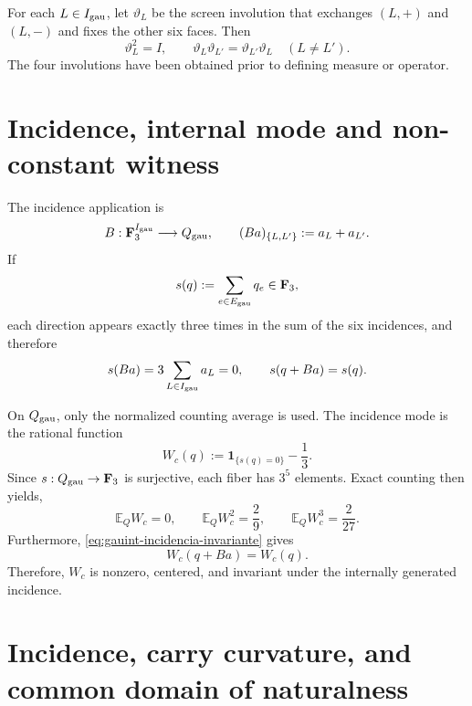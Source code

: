 For each \(L\in I_{\rm gau}\), let \(\vartheta_L\) be the screen
involution that exchanges \((L,+)\) and \((L,-)\) and fixes the other six
faces. Then
\begin{equation}\label{eq:gauint-cuatro-involuciones}
 \vartheta_L^2=I,
 \qquad
 \vartheta_L\vartheta_{L'}=\vartheta_{L'}\vartheta_L
 \quad(L\ne L').
\end{equation}
The four involutions have been obtained prior to defining measure or operator.

\section{Incidence, internal mode and non-constant witness}

The incidence application is
\begin{equation}\label{eq:gauint-incidencia-b}
 B:\mathbf F_3^{I_{\rm gau}}\longrightarrow Q_{\rm gau},
 \qquad
 (Ba)_{\{L,L'\}}:=a_L+a_{L'}.
\end{equation}
If
\[
 s(q):=\sum_{e\in E_{\rm gau}}q_e\in\mathbf F_3,
\]
each direction appears exactly three times in the sum of the six
incidences, and therefore
\begin{equation}\label{eq:gauint-incidencia-invariante}
 s(Ba)=3\sum_{L\in I_{\rm gau}}a_L=0,
 \qquad
 s(q+Ba)=s(q).
\end{equation}

On \(Q_{\rm gau}\), only the normalized counting average is used.
The incidence mode is the rational function
\begin{equation}\label{eq:gauint-wc-definicion}
 W_c(q):=\mathbf 1_{\{s(q)=0\}}-\frac13.
\end{equation}
Since \(s:Q_{\rm gau}\to\mathbf F_3\) is surjective, each fiber has \(3^5\) elements.
Exact counting then yields,
\begin{equation}\label{eq:gauint-wc-momentos}
 \mathbb E_{Q}W_c=0,
 \qquad
 \mathbb E_{Q}W_c^2=\frac29,
 \qquad
 \mathbb E_{Q}W_c^3=\frac{2}{27}.
\end{equation}
Furthermore, \eqref{eq:gauint-incidencia-invariante} gives
\begin{equation}\label{eq:gauint-wc-invariancia}
 W_c(q+Ba)=W_c(q).
\end{equation}
Therefore, \(W_c\) is nonzero, centered, and invariant under the internally
generated incidence.

\fi
\section{Incidence, carry curvature, and common domain of naturalness}

